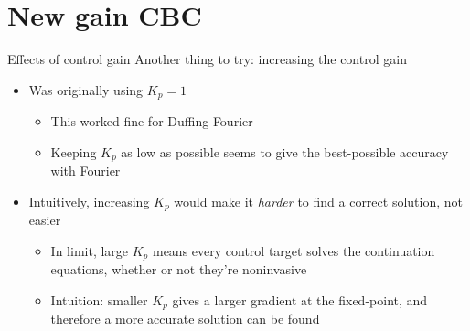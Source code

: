 \documentclass[presentation]{beamer}
\begin{document}
\section{New gain CBC}
\label{sec:org8d269a0}
\begin{frame}[label={sec:org585025d}]{Effects of control gain}
Another thing to try: increasing the control gain
\vfill
\begin{itemize}
\item Was originally using \(K_p = 1\)
\begin{itemize}
\item This worked fine for Duffing Fourier
\item Keeping \(K_p\) as low as possible seems to give the best-possible accuracy with Fourier
\end{itemize}
\end{itemize}
\vfill
\begin{itemize}
\item Intuitively, increasing \(K_p\) would make it \emph{harder} to find a correct solution, not easier
\begin{itemize}
\item In limit, large \(K_p\) means every control target solves the continuation equations, whether or not they're noninvasive
\item Intuition: smaller \(K_p\) gives a larger gradient at the fixed-point, and therefore a more accurate solution can be found
\end{itemize}
\end{itemize}
\end{frame}
\end{document}

